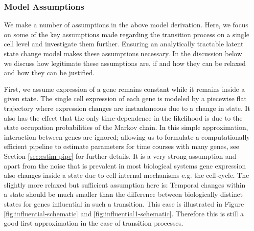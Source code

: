 \subsubsection{Model Assumptions}
\label{sec:model-assumptions}

We make a number of assumptions in the above model derivation. Here, we focus on some of the key assumptions made regarding the transition process on a single cell level and investigate them further. Ensuring an analytically tractable latent state change model makes these assumptions necessary. In the discussion below we discuss how legitimate these assumptions are, if and how they can be relaxed and how they can be justified.

First, we assume expression of a gene remains constant while it remains inside a given state. The single cell expression of each gene is modeled by a piecewise flat trajectory where expression changes are instantaneous due to a change in state. It also has the effect that the only time-dependence in the likelihood is due to the state occupation probabilities of the Markov chain. In this simple approximation, interaction between genes are ignored; allowing us to formulate a computationally efficient pipeline to estimate parameters for time courses with many genes, see Section \ref{sec:estim-pipe} for further details. It is a very strong assumption and apart from the noise that is prevalent in most biological systems gene expression also changes inside a state due to cell internal mechanisms e.g. the cell-cycle. The slightly more relaxed but sufficient assumption here is: Temporal changes within a state should be much smaller than the difference between biologically distinct states for genes influential in such a transition. This case is illustrated in Figure \ref{fig:influential-schematic} and \ref{fig:influential1-schematic}. Therefore this is still a good first approximation in the case of transition processes. 

